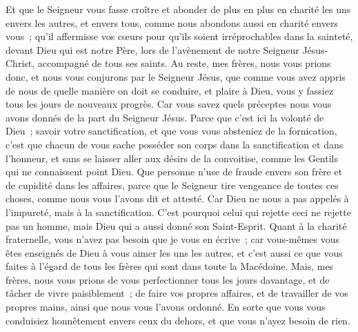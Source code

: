 \begin{multicols}{2}
Et que le Seigneur vous fasse croître et abonder de plus en plus en charité les uns envers les autres, et envers tous, comme nous abondons aussi en charité envers vous~;
qu'il affermisse vos cœurs pour qu'ils soient irréprochables dans la sainteté, devant Dieu qui est notre Père, lors de l'avènement de notre Seigneur Jésus-Christ, accompagné de tous ses saints.
\VerseOne{}Au reste, mes frères, nous vous prions donc, et nous vous conjurons par le Seigneur Jésus, que comme vous avez appris de nous de quelle manière on doit se conduire, et plaire à Dieu, vous y fassiez tous les jours de nouveaux progrès.
Car vous savez quels préceptes nous vous avons donnés de la part du Seigneur Jésus.
Parce que c'est ici la volonté de Dieu~; savoir votre sanctification, et que vous vous absteniez de la fornication,
c'est que chacun de vous sache posséder son corps dans la sanctification et dans l'honneur,
et sans se laisser aller aux désirs de la convoitise, comme les Gentils qui ne connaissent point Dieu.
Que personne n'use de fraude envers son frère et de cupidité dans les affaires, parce que le Seigneur tire vengeance de toutes ces choses, comme nous vous l'avons dit et attesté.
Car Dieu ne nous a pas appelés à l'impureté, mais à la sanctification.
C'est pourquoi celui qui rejette ceci ne rejette pas un homme, mais Dieu qui a aussi donné son Saint-Esprit.
Quant à la charité fraternelle, vous n'avez pas besoin que je vous en écrive~; car vous-mêmes vous êtes enseignés de Dieu à vous aimer les uns les autres,
et c'est aussi ce que vous faites à l'égard de tous les frères qui sont dans toute la Macédoine. Mais, mes frères, nous vous prions de vous perfectionner tous les jours davantage,
et de tâcher de vivre paisiblement~; de faire vos propres affaires, et de travailler de vos propres mains, ainsi que nous vous l'avons ordonné.
En sorte que vous vous conduisiez honnêtement envers ceux du dehors, et que vous n'ayez besoin de rien.

\end{multicols}
